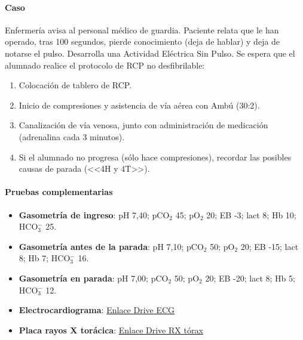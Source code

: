 \paragraph{Caso} Enfermería avisa al personal médico de guardia. Paciente relata que le han operado, tras 100 segundos, pierde conocimiento (deja de hablar) y deja de notarse el pulso. Desarrolla una Actividad Eléctrica Sin Pulso. Se espera que el alumnado realice el protocolo de RCP no desfibrilable:
\begin{enumerate}[topsep=0pt, partopsep=0pt,itemsep=0pt,parsep=0pt]
    \item Colocación de tablero de RCP.
    \item Inicio de compresiones y asistencia de vía aérea con Ambú (30:2).
    \item Canalización de vía venosa, junto con administración de medicación (adrenalina cada 3 minutos).
    \item Si el alumnado no progresa (sólo hace compresiones), recordar las posibles causas de parada (<<4H y 4T>>).
\end{enumerate}
\vspace{-12.5pt}
\paragraph{Pruebas complementarias}
\begin{itemize}[topsep=0pt, partopsep=0pt,itemsep=0pt,parsep=0pt]
    \item\textbf{Gasometría de ingreso}: pH 7,40; pCO$_2$ 45; pO$_2$ 20; EB -3; lact 8; Hb 10; HCO$_3^-$ 25.
    \item \textbf{Gasometría antes de la parada}: pH 7,10; pCO$_2$ 50; pO$_2$ 20; EB -15; lact 8; Hb 7; HCO$_3^-$ 16.
    \item \textbf{Gasometría en parada}: pH 7,00; pCO$_2$ 50; pO$_2$ 20; EB -20; lact 8; Hb 5; HCO$_3^-$ 12.
    \item \textbf{Electrocardiograma}: \href{https://drive.google.com/file/d/1GqvXc-N3dV9uCyPzkvCrG4abnPIkZzwb/view?usp=share\_link}{Enlace Drive ECG}
    \item \textbf{Placa rayos X torácica}: \href{https://drive.google.com/file/d/13VFzIBswwJGnbaB4wLQZWEIJGqibEyjh/view?usp=share\_link}{Enlace Drive RX tórax}
\end{itemize}


